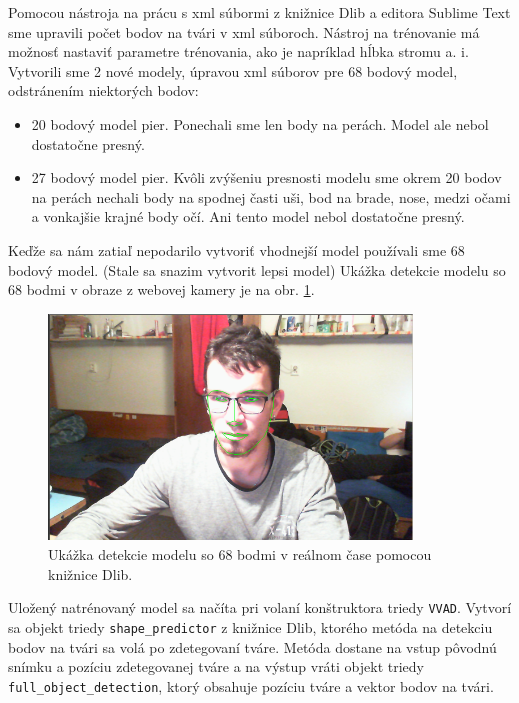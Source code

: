 Pomocou nástroja na prácu s xml súbormi z knižnice Dlib a editora Sublime Text sme upravili počet bodov na tvári v xml súboroch.
Nástroj na trénovanie má možnosť nastaviť parametre trénovania, ako je napríklad hĺbka stromu a. i. 
Vytvorili sme 2 nové modely, úpravou xml súborov pre 68 bodový model, odstránením niektorých bodov:
\begin{itemize}
	\item 20 bodový model pier. 
	Ponechali sme len body na perách. 
	Model ale nebol dostatočne presný.
	\item 27 bodový model pier.
	Kvôli zvýšeniu presnosti modelu sme okrem 20 bodov na perách nechali body na spodnej časti uši, bod na brade, nose, medzi očami a vonkajšie krajné body očí.
	Ani tento model nebol dostatočne presný.
\end{itemize}

Keďže sa nám zatiaľ nepodarilo vytvoriť vhodnejší model používali sme 68 bodový model.
(Stale sa snazim vytvorit lepsi model)
Ukážka detekcie modelu so 68 bodmi v obraze z webovej kamery je na obr. \ref{pic-detekciaKsicht}.

\begin{figure}[H]
	\begin{center}
		\includegraphics[height=6cm]{pics/detekciaKsicht.png}
		\caption{Ukážka detekcie modelu so 68 bodmi v reálnom čase pomocou knižnice Dlib.}
		\label{pic-detekciaKsicht}
	\end{center}
\end{figure}

Uložený natrénovaný model sa načíta pri volaní konštruktora triedy \texttt{VVAD}.
Vytvorí sa objekt triedy \texttt{shape\_predictor} z knižnice Dlib, ktorého metóda na detekciu bodov na tvári sa volá po zdetegovaní tváre.
Metóda dostane na vstup pôvodnú snímku a pozíciu zdetegovanej tváre a na výstup vráti objekt triedy \texttt{full\_object\_detection}, ktorý obsahuje pozíciu tváre a vektor bodov na tvári.

